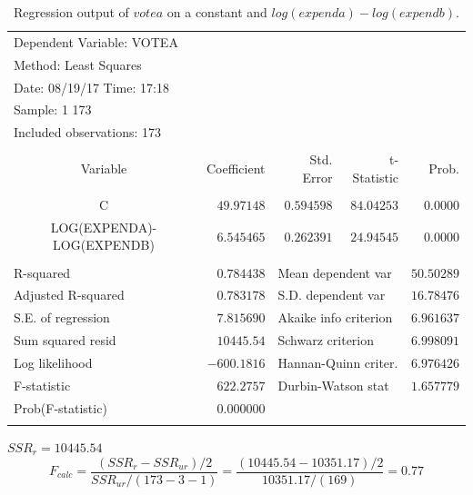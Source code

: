 \documentclass[12pt]{report}
\begin{document}
\begin{table}[H]
	\centering
	\begin{tabular}{lrrrr}
		\multicolumn{3}{l}{Dependent Variable: VOTEA}&\multicolumn{1}{c}{}&\multicolumn{1}{c}{}\\
		\multicolumn{3}{l}{Method: Least Squares}&\multicolumn{1}{c}{}&\multicolumn{1}{c}{}\\
		\multicolumn{3}{l}{Date: 08/19/17   Time: 17:18}&\multicolumn{1}{c}{}&\multicolumn{1}{c}{}\\
		\multicolumn{2}{l}{Sample: 1 173}&\multicolumn{1}{c}{}&\multicolumn{1}{c}{}&\multicolumn{1}{c}{}\\
		\multicolumn{3}{l}{Included observations: 173}&\multicolumn{1}{c}{}&\multicolumn{1}{c}{}\\
		[4.5pt] \hline \\ [-4.5pt]
		\multicolumn{1}{c}{Variable}&\multicolumn{1}{r}{Coefficient}&\multicolumn{1}{r}{Std. Error}&\multicolumn{1}{r}{t-Statistic}&\multicolumn{1}{r}{Prob.}\\
		[4.5pt] \hline \\ [-4.5pt]
		\multicolumn{1}{c}{C}&\multicolumn{1}{r}{$49.97148$}&\multicolumn{1}{r}{$0.594598$}&\multicolumn{1}{r}{$84.04253$}&\multicolumn{1}{r}{$0.0000$}\\
		\multicolumn{1}{c}{LOG(EXPENDA)-LOG(EXPENDB)}&\multicolumn{1}{r}{$6.545465$}&\multicolumn{1}{r}{$0.262391$}&\multicolumn{1}{r}{$24.94545$}&\multicolumn{1}{r}{$0.0000$}\\
		[4.5pt] \hline \\ [-4.5pt]
		\multicolumn{1}{l}{R-squared}&\multicolumn{1}{r}{$0.784438$}&\multicolumn{2}{l}{Mean dependent var}&\multicolumn{1}{r}{$50.50289$}\\
		\multicolumn{1}{l}{Adjusted R-squared}&\multicolumn{1}{r}{$0.783178$}&\multicolumn{2}{l}{S.D. dependent var}&\multicolumn{1}{r}{$16.78476$}\\
		\multicolumn{1}{l}{S.E. of regression}&\multicolumn{1}{r}{$7.815690$}&\multicolumn{2}{l}{Akaike info criterion}&\multicolumn{1}{r}{$6.961637$}\\
		\multicolumn{1}{l}{Sum squared resid}&\multicolumn{1}{r}{$10445.54$}&\multicolumn{2}{l}{Schwarz criterion}&\multicolumn{1}{r}{$6.998091$}\\
		\multicolumn{1}{l}{Log likelihood}&\multicolumn{1}{r}{$-600.1816$}&\multicolumn{2}{l}{Hannan-Quinn criter.}&\multicolumn{1}{r}{$6.976426$}\\
		\multicolumn{1}{l}{F-statistic}&\multicolumn{1}{r}{$622.2757$}&\multicolumn{2}{l}{Durbin-Watson stat}&\multicolumn{1}{r}{$1.657779$}\\
		\multicolumn{1}{l}{Prob(F-statistic)}&\multicolumn{1}{r}{$0.000000$}&\multicolumn{1}{c}{}&\multicolumn{1}{c}{}&\multicolumn{1}{c}{}\\
		[4.5pt] \hline \\ [-4.5pt]
	\end{tabular}
	\caption{Regression output of $votea$ on a constant and $log(expenda)-log(expendb)$.}
\end{table}
\vspace{-\baselineskip}
\centering $SSR_r = 10445.54$
$$F_{calc} = \dfrac{(SSR_r - SSR_{ur})/2}{SSR_{ur}/(173-3-1)} = \dfrac{(10445.54-10351.17)/2}{10351.17/(169)} = 0.77 $$
\end{document}
